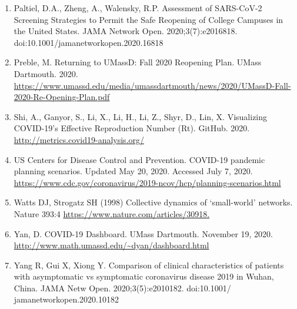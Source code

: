 \documentclass[fullpage]{extarticle}
\begin{document}
\begin{enumerate}
	\item \label{ref:10}Paltiel, D.A., Zheng, A., Walensky, R.P. Assessment of SARS-CoV-2 Screening Strategies to 
Permit the Safe Reopening of College Campuses in the United States. JAMA Network Open. 2020;3(7):e2016818. doi:10.1001/jamanetworkopen.2020.16818
	\item \label{ref:11}Preble, M. Returning to UMassD: Fall 2020 Reopening Plan. UMass Dartmouth. 2020.\hfill\break
	\url{https://www.umassd.edu/media/umassdartmouth/news/2020/UMassD-Fall-2020-Re-Opening-Plan.pdf}
	\item \label{ref:12}Shi, A., Ganyor, S., Li, X., Li, H., Li, Z., Shyr, D., Lin, X. Visualizing COVID-19’s Effective 
Reproduction Number (Rt). GitHub. 2020.\hfill\break
	\url{http://metrics.covid19-analysis.org/}
	\item \label{ref:13}US Centers for Disease Control and Prevention. COVID-19 pandemic planning scenarios. 
Updated May 20, 2020. Accessed July 7, 2020.\hfill\break
	\url{https://www.cdc.gov/coronavirus/2019-ncov/hcp/planning-scenarios.html}
	\item \label{ref:14}Watts DJ, Strogatz SH (1998) Collective dynamics of ‘small-world’ networks. Nature 393:4\hfill\break
	\url{https://www.nature.com/articles/30918.}
	\item \label{ref:15}Yan, D. COVID-19 Dashboard. UMass Dartmouth. November 19, 2020.\hfill\break
	\url{http://www.math.umassd.edu/~dyan/dashboard.html}
	\item \label{ref:16}Yang R, Gui X, Xiong Y. Comparison of clinical characteristics of patients with asymptomatic vs 
symptomatic coronavirus disease 2019 in Wuhan, China. JAMA Netw Open. 2020;3(5):e2010182. doi:10.1001/ jamanetworkopen.2020.10182

\end{enumerate}
\end{document}
